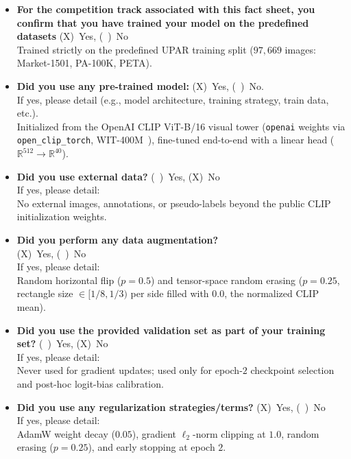 \documentclass[a4paper, 10pt, conference]{ieeeconf}
\begin{document}
\begin{itemize}
\item \textbf{For the competition track associated with this fact sheet, you confirm that you have trained your model on the predefined datasets} (X)~Yes, (~)~No\\
Trained strictly on the predefined UPAR training split ($97{,}669$ images: Market-1501, PA-100K, PETA).

\item \textbf{Did you use any pre-trained model:} (X)~Yes, (~)~No.\\ If yes, please detail (e.g., model architecture, training strategy, train data, etc.).\\
%
Initialized from the OpenAI CLIP ViT-B/16 visual tower (\texttt{openai} weights via \texttt{open\_clip\_torch}, WIT-400M~\cite{radford2021clip}), fine-tuned end-to-end with a linear head ($\mathbb{R}^{512}\to\mathbb{R}^{40}$).

\item \textbf{Did you use external data?} (~)~Yes, (X)~No\\
If yes, please detail:\\
%
No external images, annotations, or pseudo-labels beyond the public CLIP initialization weights.

\item \textbf{Did you perform any data augmentation?} \\(X)~Yes, (~)~No\\
If yes, please detail:\\
%
Random horizontal flip ($p=0.5$) and tensor-space random erasing ($p=0.25$, rectangle size $\in[1/8,1/3)$ per side filled with $0.0$, the normalized CLIP mean).

\item \textbf{Did you use the provided validation set as part of your training set?} (~)~Yes, (X)~No\\
If yes, please detail:\\
%
Never used for gradient updates; used only for epoch-$2$ checkpoint selection and post-hoc logit-bias calibration.

\item \textbf{Did you use any regularization strategies/terms?} (X)~Yes, (~)~No\\
If yes, please detail:\\
%
AdamW weight decay ($0.05$), gradient $\ell_2$-norm clipping at $1.0$, random erasing ($p=0.25$), and early stopping at epoch $2$.


\end{itemize}
\end{document}
